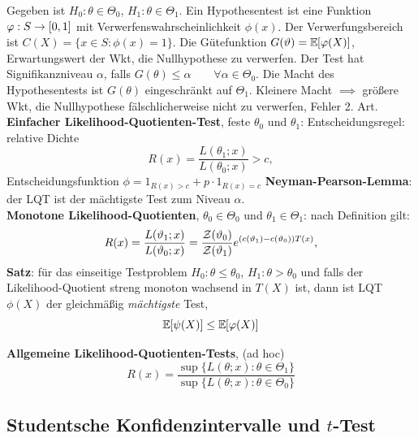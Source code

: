 \begin{outline}
\0 Gegeben ist $H_0: \theta \in \Theta_0$, $H_1: \theta \in \Theta_1$.
    \1 Ein Hypothesentest ist eine Funktion $\varphi:S\rightarrow [0,1]$ mit Verwerfenswahrscheinlichkeit $\phi(x)$.
    \1 Der Verwerfungsbereich ist $C(X)=\{x\in S : \phi(x)=1\}$.
    \1 Die Gütefunktion $G(\vartheta)=\mathbb{E}\hspace{-2pt}\left[{\varphi(X)}\right]$, Erwartungswert der Wkt, die Nullhypothese zu verwerfen.
    \1 Der Test hat Signifikanzniveau $\alpha$, falls $G(\theta)\leq \alpha \qquad\forall \alpha \in \Theta_0$.
    \1 Die Macht des Hypothesentests ist $G(\theta)$ eingeschränkt auf $\Theta_1$. Kleinere Macht $\implies$ größere Wkt, die Nullhypothese fälschlicherweise nicht zu verwerfen, Fehler 2. Art.
\0 \textbf{Einfacher Likelihood-Quotienten-Test}, feste $\theta_0$ und $\theta_1$:
    \1 Entscheidungsregel: relative Dichte $$R(x)=\frac{L(\theta_1;x)}{L(\theta_0;x)}>c,$$
    \1 Entscheidungsfunktion $\phi = 1_{R(x)>c} + p\cdot 1_{R(x)=c}$
    \1 \textbf{Neyman-Pearson-Lemma}: der LQT ist der mächtigste Test zum Niveau $\alpha$.\\
\0 \textbf{Monotone Likelihood-Quotienten}, $\theta_0\in\Theta_0$ und $\theta_1\in\Theta_1$: 
    \1 nach Definition gilt: 
    $$R(x)=\frac{L(\theta_1;x)}{L(\theta_0;x)}=\frac{\cZ(\theta_0)}{\cZ(\theta_1)} e^{\Large(c(\theta_1)-c(\theta_0)\Large)T(x)},$$
    \1 \textbf{Satz}: für das einseitige Testproblem $H_0 : \theta \leq \theta_0$, $H_1: \theta > \theta_0$ und falls der Likelihood-Quotient streng monoton wachsend in $T(X)$ ist, dann ist LQT $\phi(X)$ der gleichmäßig \emph{mächtigste} Test,
    $$\mathbb{E}\hspace{-2pt}\left[{\psi(X)}\right] \leq \mathbb{E}\hspace{-2pt}\left[{\varphi(X)}\right] $$

\0 \textbf{Allgemeine Likelihood-Quotienten-Tests}, (ad hoc)  
$$R(x)=\frac{\sup \{L(\theta;x) : \theta \in \Theta_1\}}{\sup \{L(\theta;x) : \theta \in \Theta_0\}}$$
\end{outline}

\subsection{Studentsche Konfidenzintervalle und $t$-Test}

